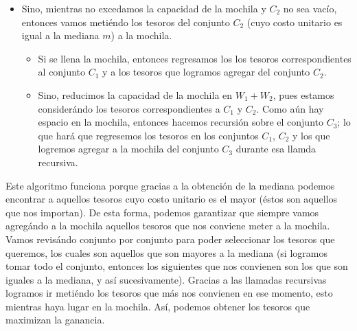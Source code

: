 \documentclass[letterpaper,11pt]{article}
\begin{document}
\begin{enumerate}
\begin{itemize}
\begin{itemize}
\begin{itemize}
                \item Sino, mientras no excedamos la capacidad de la mochila 
                y $C_2$ no sea vacío, entonces vamos metiéndo los tesoros del 
                conjunto $C_2$ (cuyo costo unitario es igual a la mediana $m$)
                a la mochila.
                \begin{itemize}
                    \item Si se llena la mochila, entonces regresamos los 
                    los tesoros correspondientes al conjunto $C_1$ y a los 
                    tesoros que logramos agregar del conjunto $C_2$.

                    \item Sino, reducimos la capacidad de la mochila en 
                    $W_1 + W_2$, pues estamos considerándo los tesoros 
                    correspondientes a $C_1$ y $C_2$. Como aún hay espacio 
                    en la mochila, entonces hacemos recursión sobre el 
                    conjunto $C_3$; lo que hará que regresemos los tesoros 
                    en los conjuntos $C_1$, $C_2$ y los que logremos agregar 
                    a la mochila del conjunto $C_3$ durante esa llamda
                    recursiva. 
                \end{itemize}
            \end{itemize}

            Este algoritmo funciona porque gracias a la obtención de la 
            mediana podemos encontrar a aquellos tesoros cuyo costo unitario 
            es el mayor (éstos son aquellos que nos importan). De esta forma, 
            podemos garantizar que siempre vamos agregándo a la mochila 
            aquellos tesoros que nos conviene meter a la mochila. Vamos 
            revisándo conjunto por conjunto para poder seleccionar los 
            tesoros que queremos, los cuales son aquellos que son mayores a la 
            mediana (si logramos tomar todo el conjunto, entonces los 
            siguientes que nos convienen son los que son iguales a la mediana, 
            y así sucesivamente). Gracias a las llamadas recursivas logramos 
            ir metiéndo los tesoros que más nos convienen en ese momento, esto 
            mientras haya lugar en la mochila. Así, podemos obtener los tesoros 
            que maximizan la ganancia. 


\end{itemize}
\end{itemize}
\end{enumerate}
\end{document}
